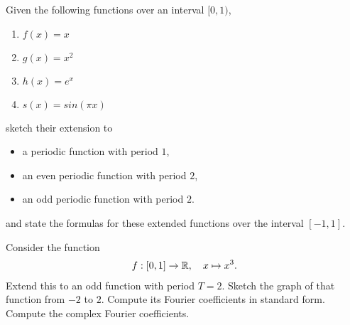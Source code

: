 \documentclass[11pt]{article}
\begin{document}

\begin{exercise}
    Given the following functions over an interval $[0,1)$, 
    \begin{enumerate}[label=(\alph*)]
        \item $f(x) = x$
        \item $g(x) = x^2$
        \item $h(x) = e^x$
        \item $s(x) = sin(\pi x)$
    \end{enumerate}
    sketch their extension to 
    \begin{itemize}
        \item a periodic function with period $1$,
        \item an even periodic function with period $2$,
        \item an odd periodic function with period $2$.
    \end{itemize}
    and state the formulas for these extended functions over the interval $[-1,1]$.
\end{exercise}

\begin{solution}     
\end{solution}



\begin{exercise}
    Consider the function 
    \begin{align*}
        f : [0,1] \to \mathbb{R}, \quad x \mapsto x^{3}.
    \end{align*}
    Extend this to an odd function with period $T = 2$. Sketch the graph of that function from $-2$ to $2$.
    Compute its Fourier coefficients in standard form. Compute the complex Fourier coefficients.
\end{exercise}
\begin{solution}     
\end{solution}
\end{document}
